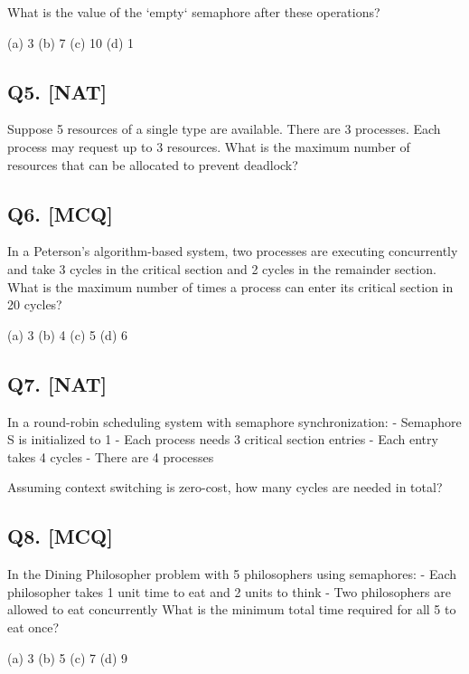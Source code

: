 What is the value of the `empty` semaphore after these operations?

(a) 3 \quad (b) 7 \quad (c) 10 \quad (d) 1

\vspace{1em}

\subsection*{Q5. [NAT]}
Suppose 5 resources of a single type are available. There are 3 processes. Each process may request up to 3 resources. What is the maximum number of resources that can be allocated to prevent deadlock?

\vspace{1em}

\subsection*{Q6. [MCQ]}
In a Peterson's algorithm-based system, two processes are executing concurrently and take 3 cycles in the critical section and 2 cycles in the remainder section. What is the maximum number of times a process can enter its critical section in 20 cycles?

(a) 3 \quad (b) 4 \quad (c) 5 \quad (d) 6

\vspace{1em}

\subsection*{Q7. [NAT]}
In a round-robin scheduling system with semaphore synchronization:
- Semaphore S is initialized to 1
- Each process needs 3 critical section entries
- Each entry takes 4 cycles
- There are 4 processes

Assuming context switching is zero-cost, how many cycles are needed in total?

\vspace{1em}

\subsection*{Q8. [MCQ]}
In the Dining Philosopher problem with 5 philosophers using semaphores:
- Each philosopher takes 1 unit time to eat and 2 units to think
- Two philosophers are allowed to eat concurrently
What is the minimum total time required for all 5 to eat once?

(a) 3 \quad (b) 5 \quad (c) 7 \quad (d) 9

